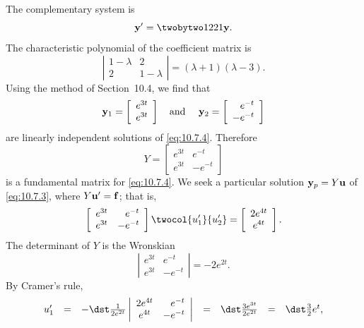 \begin{examplesolution}
 The complementary system is
\begin{equation}
  \label{eq:10.7.4}{\bf y}'=\twobytwo1221{\bf y}.
\end{equation}
The characteristic polynomial of the coefficient matrix is
\[
  \left|
  \begin{array}{cc}
    1-\lambda & 2         \\
    2         & 1-\lambda
  \end{array}\right|= (\lambda+1)(\lambda-3).
\]
Using the method of Section~10.4, we find that
\[
  {\bf y}_{1}=\left[
  \begin{array}{r}
    e^{3t} \\
    e^{3t}
  \end{array}\right] \mbox{\quad and \quad}{\bf y}_{2}=\left[
  \begin{array}{r}
    e^{-t}  \\
    -e^{-t}
  \end{array}\right]
\]
are linearly independent solutions of \eqref{eq:10.7.4}. Therefore
\[
  Y=\left[
  \begin{array}{rr}
    e^{3t} & e^{-t}  \\
    e^{3t} & -e^{-t}
  \end{array}\right]
\]
is a fundamental matrix for \eqref{eq:10.7.4}. We seek a particular solution ${\bf y}_{p}=Y{\bf u}$
of \eqref{eq:10.7.3}, where $Y{\bf u}'={\bf f}$; that is,
\[
  \left[
  \begin{array}{rr}
    e^{3t} & e^{-t}  \\
    e^{3t} & -e^{-t}
  \end{array}\right] \twocol{u_{1}'}{u_{2}'}=\left[
  \begin{array}{c}
    2e^{4t} \\
    e^{4t}
  \end{array}\right].
\]
The determinant of $Y$ is the Wronskian
\[
  \left|
  \begin{array}{rr}
    e^{3t} & e^{-t}  \\
    e^{3t} & -e^{-t}
  \end{array}\right| =-2e^{2t}.
\]
By Cramer's rule,
\[
  \begin{array}{ccccccl}
    u_{1}' & = & -\dst\frac{1}{2e^{2t}} \left|\begin{array}{cr}2e^{4t}&e^{-t}\\e^{4t}&-e^{-t}\end{array}\right| & = & \dst\frac{3e^{3t}}{2e^{2t}} & = & \dst\frac{3}{2}e^{t},  \\[4\jot]

\end{array}\]
\end{examplesolution}

